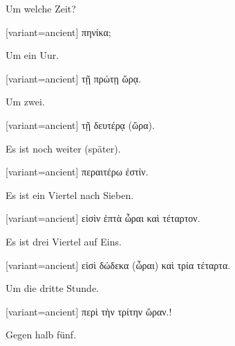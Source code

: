Um welche Zeit?

\switchcolumn

\begin{greek}[variant=ancient]%
πηνίκα;

\end{greek}%
\switchcolumn*

Um ein Uur.

\switchcolumn

\begin{greek}[variant=ancient]%
τῇ πρώτῃ ὥρᾳ.

\end{greek}%
\switchcolumn*

Um zwei.

\switchcolumn

\begin{greek}[variant=ancient]%
τῇ δευτέρᾳ (ὥρα).

\end{greek}%
\switchcolumn*

Es ist noch weiter (später).

\switchcolumn

\begin{greek}[variant=ancient]%
περαιτέρω ἐστίν.

\end{greek}%
\switchcolumn*

Es ist ein Viertel nach Sieben.

\switchcolumn

\begin{greek}[variant=ancient]%
εἰσὶν ἑπτὰ ὦραι καὶ τέταρτον.

\end{greek}%
\switchcolumn*

Es ist drei Viertel auf Eins.

\switchcolumn

\begin{greek}[variant=ancient]%
εἰσὶ δώδεκα (ὦραι) καὶ τρία τέταρτα.

\end{greek}%
\switchcolumn*

Um die dritte Stunde.

\switchcolumn

\begin{greek}[variant=ancient]%
περὶ τὴν τρίτην ὥραν.!

\end{greek}%
\switchcolumn*

Gegen halb fünf.

\switchcolumn

